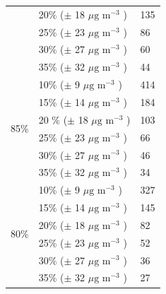 \begin{table}[H]
\begin{tabular}{|l|l|l|}
                        &            20\% ($\pm$ 18  $\mu \text{g m}^{-3}$ )    &        135                   \\ \cline{2-3} 
                        &            25\% ($\pm$ 23  $\mu \text{g m}^{-3}$ )    &        86                    \\ \cline{2-3} 
                        &            30\% ($\pm$ 27  $\mu \text{g m}^{-3}$ )    &        60                    \\ \cline{2-3} 
                        &            35\% ($\pm$ 32  $\mu \text{g m}^{-3}$ )    &        44                    \\ \hline
\multirow{6}{*}{85\%}   &            10\% ($\pm$ 9   $\mu \text{g m}^{-3}$ )    &        414                   \\ \cline{2-3} 
                        &            15\% ($\pm$ 14  $\mu \text{g m}^{-3}$ )    &        184                   \\ \cline{2-3} 
                        &            20 \% ($\pm$ 18 $\mu \text{g m}^{-3}$ )    &        103                   \\ \cline{2-3} 
                        &            25\% ($\pm$ 23  $\mu \text{g m}^{-3}$ )    &        66                    \\ \cline{2-3} 
                        &            30\% ($\pm$ 27  $\mu \text{g m}^{-3}$ )    &        46                    \\ \cline{2-3} 
                        &            35\% ($\pm$ 32  $\mu \text{g m}^{-3}$ )    &        34                    \\ \hline
\multirow{6}{*}{80\%}   &            10\% ($\pm$ 9   $\mu \text{g m}^{-3}$ )    &        327                   \\ \cline{2-3} 
                        &            15\% ($\pm$ 14  $\mu \text{g m}^{-3}$ )    &        145                   \\ \cline{2-3} 
                        &            20\% ($\pm$ 18  $\mu \text{g m}^{-3}$ )    &        82                    \\ \cline{2-3} 
                        &            25\% ($\pm$ 23  $\mu \text{g m}^{-3}$ )    &        52                    \\ \cline{2-3} 
                        &            30\% ($\pm$ 27  $\mu \text{g m}^{-3}$ )    &        36                    \\ \cline{2-3} 
                        &            35\% ($\pm$ 32   $\mu \text{g m}^{-3}$ )   &        27                    \\ \hline
\end{tabular}
\label{tab:no2_samples_needed}
\end{table}

